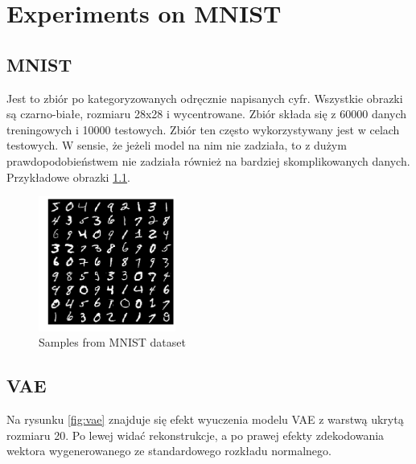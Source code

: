 \chapter{Experiments on MNIST}

\section{MNIST}

Jest to zbiór po kategoryzowanych odręcznie napisanych cyfr. Wszystkie obrazki są czarno-białe, rozmiaru 28x28 i wycentrowane. Zbiór składa się z 60000 danych treningowych i 10000 testowych. Zbiór ten często wykorzystywany jest w celach testowych. W sensie, że jeżeli model na nim nie zadziała, to z dużym prawdopodobieństwem nie zadziała również na bardziej skomplikowanych danych. Przykładowe obrazki \ref{fig:mnist}.

\begin{figure}[h!]
    \centering
    \includegraphics[width=0.4\textwidth]{images/mnist}
    \caption{Samples from MNIST dataset}
    \label{fig:mnist}
\end{figure}

\section{VAE}

Na rysunku \ref{fig:vae} znajduje się efekt wyuczenia modelu VAE z warstwą ukrytą rozmiaru 20. Po lewej widać rekonstrukcje, a po prawej efekty zdekodowania wektora wygenerowanego ze standardowego rozkładu normalnego.

